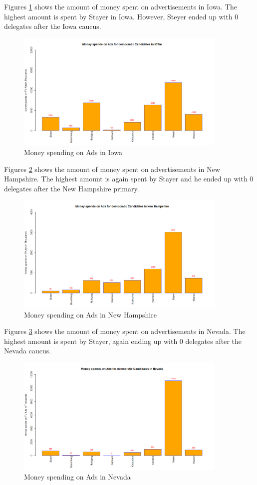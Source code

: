 Figures \ref{IOWA} shows the amount of money spent on advertisements in Iowa. The highest amount is spent by Stayer in Iowa. However, Steyer ended up with 0 delegates after the Iowa caucus. 
\begin{figure}[H]
    \centering
    \includegraphics[width=0.9\textwidth]{figures/IOWA.png}
    \caption{Money spending on Ads in Iowa}
    \label{IOWA}
\end{figure}
Figures \ref{Newhampshire} shows the amount of money spent on advertisements in New Hampshire. The highest amount is again spent by Stayer and he  ended up with 0 delegates after the New Hampshire primary. 
\begin{figure}[H]
    \centering
    \includegraphics[width=0.9\textwidth]{figures/Newhampshire.png}
    \caption{Money spending on Ads in New Hampshire}
    \label{Newhampshire}
\end{figure}
Figures \ref{Nevada} shows the amount of money spent on advertisements in Nevada. The highest amount is spent by Stayer, again ending up with 0 delegates after the Nevada caucus. 
\begin{figure}[H]
    \centering
    \includegraphics[width=0.9\textwidth]{figures/Nevada.png}
    \caption{Money spending on Ads in Nevada}
    \label{Nevada}
\end{figure}

